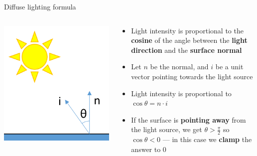 \begin{frame}{Diffuse lighting formula}
	\begin{columns}
		\begin{column}{0.25\textwidth}
			\includegraphics[width=\textwidth]{diffuse_angle}
		\end{column}
		\begin{column}{0.73\textwidth}
			\begin{itemize}
				\pause\item Light intensity is proportional to the \textbf{cosine} of the angle between the \textbf{light direction} and the \textbf{surface normal}
				\pause\item Let $n$ be the normal, and $i$ be a unit vector pointing towards the light source
				\pause\item Light intensity is proportional to
					$\cos \theta = n \cdot i$
				\pause\item If the surface is \textbf{pointing away} from the light source, we get $\theta > \frac{\pi}{2}$ so $\cos \theta < 0$ ---
					in this case we \textbf{clamp} the answer to $0$
			\end{itemize}
		\end{column}
	\end{columns}
\end{frame}

